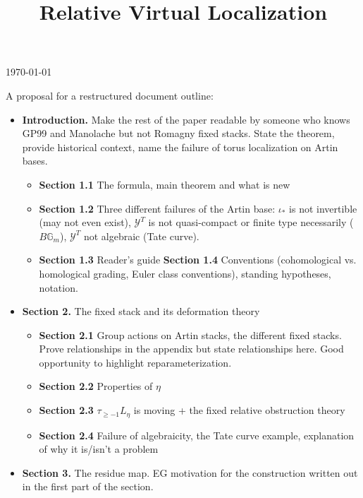 \documentclass[12pt,dvipsnames]{amsart}
\title{Relative Virtual Localization}
\begin{document}
\maketitle
\bigskip

\begin{center}
\today
\end{center}

\tableofcontents

\newpage
A proposal for a restructured document outline:
\begin{itemize}
  \item \textbf{Introduction.} Make the rest of the paper readable by someone who knows GP99 and Manolache but not Romagny fixed stacks. State the theorem, provide historical context, name the failure of torus localization on Artin bases.
    \begin{itemize}
      \item \textbf{Section 1.1} The formula, main theorem and what is new
      \item \textbf{Section 1.2} Three different failures of the Artin base: \(\iota_*\) is not invertible (may not even exist), \(\mathcal Y^T\) is not quasi-compact or finite type necessarily (\(B\mathbb G_m\)), \(\mathcal Y^T\) not algebraic (Tate curve).
      \item \textbf{Section 1.3} Reader's guide
            \textbf{Section 1.4} Conventions (cohomological vs. homological grading, Euler class conventions), standing hypotheses, notation.
    \end{itemize}
  \item \textbf{Section 2.} The fixed stack and its deformation theory
        \begin{itemize}
          \item \textbf{Section 2.1} Group actions on Artin stacks, the different fixed stacks. Prove relationships in the appendix but state relationships here. Good opportunity to highlight reparameterization.
          \item \textbf{Section 2.2} Properties of \(\eta\)
          \item \textbf{Section 2.3} \(\tau_{\geq -1}L_\eta\) is moving + the fixed relative obstruction theory
          \item \textbf{Section 2.4} Failure of algebraicity, the Tate curve example, explanation of why it is/isn't a problem
        \end{itemize}
  \item \textbf{Section 3.} The residue map. EG motivation for the construction written out in the first part of the section.

\end{itemize}
\end{document}
